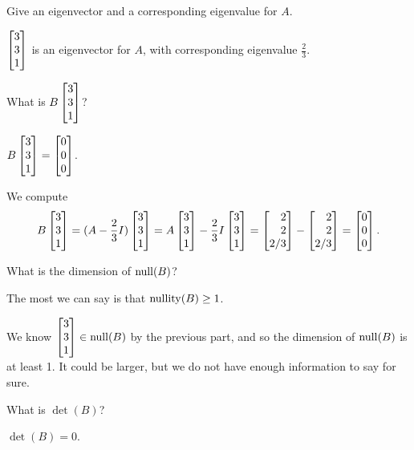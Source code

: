 	\begin{parts}
		\item Give an eigenvector and a corresponding eigenvalue for $A$.
			\begin{solution}
				$\mat{3\\3\\1}$ is an eigenvector for $A$, with corresponding
				eigenvalue $\frac{2}{3}$.
			\end{solution}
		\item What is $B\mat{3\\3\\1}$?
			\begin{solution}
				$B\mat{3\\3\\1}=\mat{0\\0\\0}$.

				We compute
				\[
					B\mat{3\\3\\1}
					=(A-\frac{2}{3}I)\mat{3\\3\\1}
					=A\mat{3\\3\\1} - \frac{2}{3}I\mat{3\\3\\1}
					=\mat{2\\2\\2/3} - \mat{2\\2\\2/3}
					=\mat{0\\0\\0}.
				\]
			\end{solution}
		\item What is the dimension of $\operatorname{null}(B)$?
			\begin{solution}
				The most we can say is that $\operatorname{nullity}(B)\geq1$.

				We know $\mat{3\\3\\1}\in\Null(B)$ by the previous part, and so
				the dimension of $\operatorname{null}(B)$ is at least 1. It could be larger, but
				we do not have enough information to say for sure.
			\end{solution}
		\item What is $\det(B)$?
			\begin{solution}[inline]
				$\det(B)=0$.
			\end{solution}
	\end{parts}

